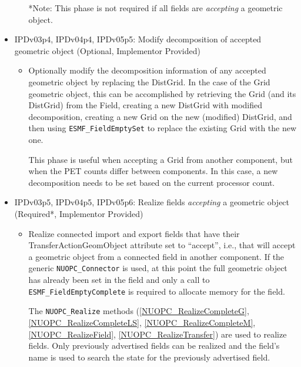 \begin{itemize}
\begin{itemize}
*Note: This phase is not required if all fields are {\em accepting} a geometric object.
  \end{itemize}
\item IPDv03p4, IPDv04p4, IPDv05p5: Modify decomposition of accepted geometric object ({\sc Optional, Implementor Provided})
  \begin{itemize}
  \item Optionally modify the decomposition information of any accepted geometric object by replacing the DistGrid. In the case of the Grid geometric object, this can be accomplished by retrieving the Grid (and its DistGrid) from the Field, creating a new DistGrid with modified decomposition, creating a new Grid on the new (modified) DistGrid, and then using {\tt ESMF\_FieldEmptySet} to replace the existing Grid with the new one.

This phase is useful when accepting a Grid from another component, but when the PET counts differ between components. In this case, a new decomposition needs to be set based on the current processor count.
  \end{itemize}
\item IPDv03p5, IPDv04p5, IPDv05p6: Realize fields {\em accepting} a geometric object ({\sc Required*, Implementor Provided})
  \begin{itemize}
  \item Realize connected import and export fields that have their TransferActionGeomObject attribute set to ``accept'', i.e., that will accept a geometric object from a connected field in another component.  If the generic {\tt NUOPC\_Connector} is used, at this point the full geometric object has already been set in the field and only a call to {\tt ESMF\_FieldEmptyComplete} is required to allocate memory for the field.

The {\tt NUOPC\_Realize} methods (\ref{NUOPC_RealizeCompleteG}, \ref{NUOPC_RealizeCompleteLS}, \ref{NUOPC_RealizeCompleteM}, \ref{NUOPC_RealizeField}, \ref{NUOPC_RealizeTransfer}) are used to realize fields. Only previously advertised fields can be realized and the field's name is used to search the state for the previously advertised field.


\end{itemize}
\end{itemize}
